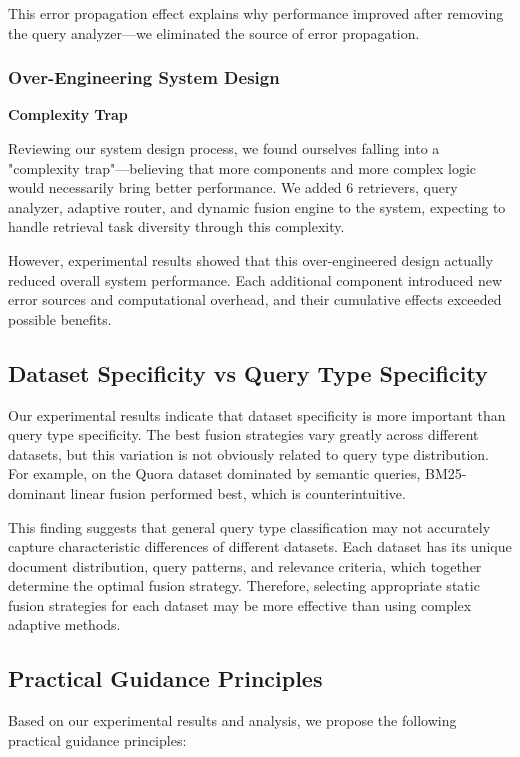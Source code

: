 \documentclass[letterpaper]{article} %
\begin{document}
This error propagation effect explains why performance improved after removing the query analyzer—we eliminated the source of error propagation.

\subsubsection{Over-Engineering System Design}

\textbf{Complexity Trap}

Reviewing our system design process, we found ourselves falling into a "complexity trap"—believing that more components and more complex logic would necessarily bring better performance. We added 6 retrievers, query analyzer, adaptive router, and dynamic fusion engine to the system, expecting to handle retrieval task diversity through this complexity.

However, experimental results showed that this over-engineered design actually reduced overall system performance. Each additional component introduced new error sources and computational overhead, and their cumulative effects exceeded possible benefits.

\subsection{Dataset Specificity vs Query Type Specificity}

Our experimental results indicate that dataset specificity is more important than query type specificity. The best fusion strategies vary greatly across different datasets, but this variation is not obviously related to query type distribution. For example, on the Quora dataset dominated by semantic queries, BM25-dominant linear fusion performed best, which is counterintuitive.

This finding suggests that general query type classification may not accurately capture characteristic differences of different datasets. Each dataset has its unique document distribution, query patterns, and relevance criteria, which together determine the optimal fusion strategy. Therefore, selecting appropriate static fusion strategies for each dataset may be more effective than using complex adaptive methods.

\subsection{Practical Guidance Principles}

Based on our experimental results and analysis, we propose the following practical guidance principles:
\end{document}
